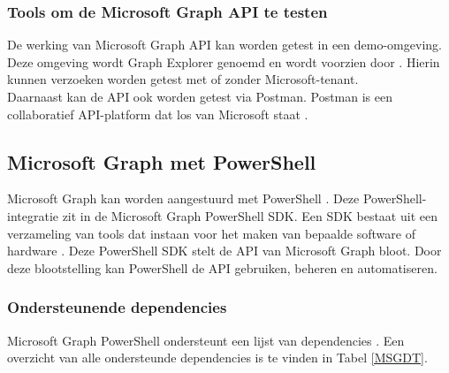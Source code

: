 \subsubsection{Tools om de Microsoft Graph API te testen}

De werking van Microsoft Graph API kan worden getest in een demo-omgeving. Deze omgeving wordt Graph Explorer genoemd en wordt voorzien door \textcite{Microsoft2023h}. Hierin kunnen verzoeken worden getest met of zonder Microsoft-tenant. \\

Daarnaast kan de API ook worden getest via Postman. Postman is een collaboratief \ac{API}-platform dat los van Microsoft staat \autocite{Postman2023}.


\subsection{Microsoft Graph met PowerShell}

Microsoft Graph kan worden aangestuurd met PowerShell \autocite{Microsoft2023j}. Deze PowerShell-integratie zit in de Microsoft Graph PowerShell \ac{SDK}. Een \ac{SDK} bestaat uit een verzameling van tools dat instaan voor het maken van bepaalde software of hardware \autocite{RedHat2020}. Deze PowerShell \ac{SDK} stelt de \ac{API} van Microsoft Graph bloot. Door deze blootstelling kan PowerShell de \ac{API} gebruiken, beheren en automatiseren.

\subsubsection{Ondersteunende dependencies}

Microsoft Graph PowerShell ondersteunt een lijst van dependencies \autocite{Microsoft2023k}. Een overzicht van alle ondersteunde dependencies is te vinden in Tabel \ref{MSGDT}. 

